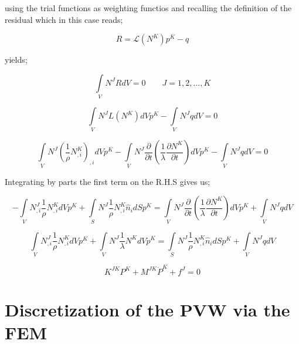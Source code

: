 using the trial functions as weighting functios and recalling the definition of the residual which in this case reads;

\[R = \mathcal{L}({N^K}){p^K} - q\]

yields;

\[\int\limits_V {{N^J}RdV = 0} \quad \quad J=1,2,...,K \]

\[\int\limits_V {{N^J}L({N^K})dV{p^K}}  - \int\limits_V {{N^J}qdV}  = 0\]

\[\int\limits_V {{N^J}{{\left( {\frac{1}{\rho }N_{,i}^K} \right)}_{,i}}dV{p^K} - \int\limits_V {{N^J}\frac{\partial }{{\partial t}}\left( {\frac{1}{\lambda }\frac{{\partial {N^K}}}{{\partial t}}} \right)dV{p^K}} }  - \int\limits_V {{N^J}qdV}  = 0\]

Integrating by parts the first term on the R.H.S gives us;

\[ - \int\limits_V {N_{,i}^J\frac{1}{\rho }N_{,i}^KdV} {p^K} + \int\limits_S {{N^J}\frac{1}{\rho }N_{,i}^K{{\hat n}_i}dS{p^K}}  = \int\limits_V {{N^J}\frac{\partial }{{\partial t}}\left( {\frac{1}{\lambda }\frac{{\partial {N^K}}}{{\partial t}}} \right)dV{p^K}}  + \int\limits_V {{N^J}qdV} \]

\[\int\limits_V {N_{,i}^J\frac{1}{\rho }N_{,i}^KdV} {p^K} + \int\limits_V {{N^J}\frac{1}{\lambda }{N^K}dV{{\ddot p}^K}}  = \int\limits_S {{N^J}\frac{1}{\rho }N_{,i}^K{{\hat n}_i}dS{p^K}}  + \int\limits_V {{N^J}qdV} \]

\[{K^{JK}}{P^K} + {M^{JK}}{{\ddot P}^K} + {f^J} = 0\]


\section[Discretization of the PVW using FEM]{Discretization of the PVW via the FEM}

